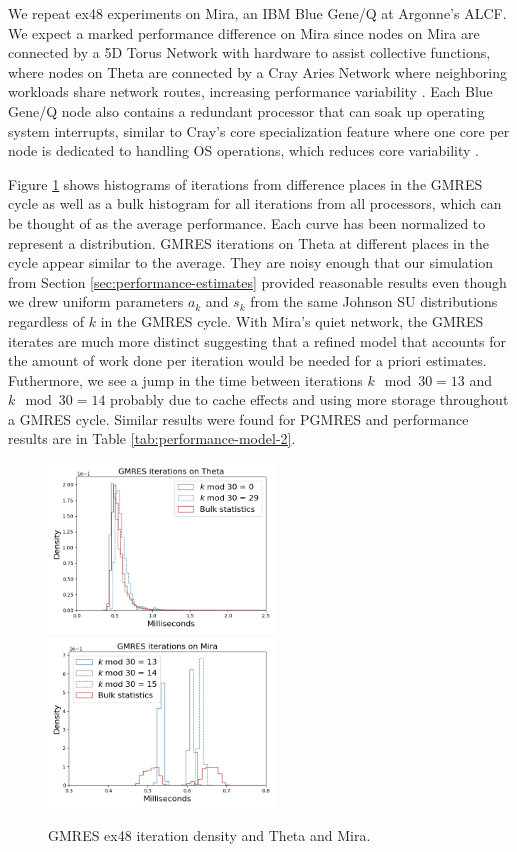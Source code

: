 \documentclass[sigconf, anonymous]{acmart}
\begin{document}
We repeat ex48 experiments on Mira, an IBM Blue Gene/Q \cite{kumaran2016introduction} at Argonne's ALCF.  
We expect a marked performance difference on Mira since 
nodes on Mira are connected by a 5D Torus Network with hardware to assist collective functions, 
where nodes on Theta are connected by a Cray Aries Network where neighboring workloads share network routes, increasing performance variability \cite{groves2017understanding}. 
Each Blue Gene/Q node also contains a redundant processor that can soak up operating system interrupts, similar to Cray's core specialization feature where one core per node is dedicated to handling OS operations, which reduces core variability \cite{chunduri2017run}.


Figure \ref{fig:mira} shows histograms of iterations from difference places in the GMRES cycle as well as a bulk histogram for all iterations from all processors, which can be thought of as the average performance. Each curve has been normalized to represent a distribution.  
GMRES iterations on Theta at different places in the cycle appear similar to the average. They are noisy enough that our simulation from Section \ref{sec:performance-estimates} provided reasonable results even though we drew uniform parameters $a_k$ and $s_k$ from the same Johnson SU distributions regardless of $k$ in the GMRES cycle. 
With Mira's quiet network, the GMRES iterates are much more distinct suggesting that a refined model that accounts for the amount of work done per iteration would be needed for a priori estimates.
Futhermore, we see a jump in the time between iterations $k \mod 30 = 13$ and $k \mod 30 = 14$ probably due to cache effects and using more storage throughout a GMRES cycle. 
Similar results were found for PGMRES and performance results are in Table \ref{tab:performance-model-2}.




\begin{figure}
\centering
\includegraphics[width=6cm]{../plots/GMRES_ex48_8192_1000000__bulk_statistics_with_k_mod_30_.png}
\includegraphics[width=6cm]{../plots/GMRES_MIRA_ex48_8192_1000000__bulk_statistics_with_k_mod_30_.png}
\caption{GMRES ex48 iteration density and Theta and Mira.}  \label{fig:mira}
\end{figure}
\end{document}
